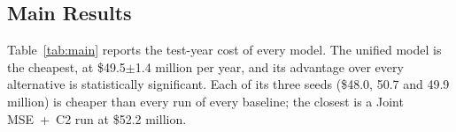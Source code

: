 \subsection{Main Results}
\label{sec:main-results}

Table~\ref{tab:main} reports the test-year cost of every model.  The unified
model is the cheapest, at \$49.5$\pm$1.4 million per year, and its advantage
over every alternative is statistically significant.  Each of its three seeds
(\$48.0, 50.7 and 49.9 million) is cheaper than every run of every baseline;
the closest is a Joint MSE~+~C2 run at \$52.2 million.

\begin{table}[t]
    \centering
    \small
    \setlength{\tabcolsep}{4pt}
    \caption{Excess cost on the test year 2025 (million US\$ per year; mean
             $\pm$ standard deviation over three seeds), split into
             under- and over-prediction.  MAE and RMSE in MW; coverage
             $=P(y_t\le p_t)$.  $\Delta$: cost of the unified model minus that
             of the row, with the Diebold--Mariano $p$-value.}
    \label{tab:main}
\end{table}
